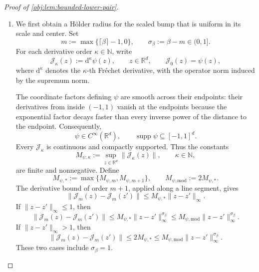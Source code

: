 \documentclass[11pt]{article}
\begin{document}
\begin{proof}[Proof of \cref{obj:lem:bounded-lower-pair}]
\begin{enumerate}
\item We first obtain a Hölder radius for the scaled bump that is uniform in its scale and center. Set
\[
m:=\max\{\lceil\beta\rceil-1,0\},
\qquad
\sigma_\beta:=\beta-m\in(0,1].
\]
For each derivative order \(\kappa\in\mathbb N\), write
\[
\mathscr J_\kappa(z):=\mathrm d^\kappa\psi(z),
\qquad z\in\mathbb R^d,
\qquad
\mathscr J_0(z)=\psi(z),
\]
where \(\mathrm d^\kappa\) denotes the \(\kappa\)-th Fréchet derivative, with the operator norm induced by the supremum norm.

The coordinate factors defining \(\psi\) are smooth across their endpoints: their derivatives from inside \((-1,1)\) vanish at the endpoints because the exponential factor decays faster than every inverse power of the distance to the endpoint. Consequently,
\[
\psi\in C^\infty(\mathbb R^d),
\qquad
\operatorname{supp}\psi\subseteq[-1,1]^d.
\]
Every \(\mathscr J_\kappa\) is continuous and compactly supported. Thus the constants
\[
M_{\psi,\kappa}:=
\sup_{z\in\mathbb R^d}\|\mathscr J_\kappa(z)\|,
\qquad \kappa\in\mathbb N,
\]
are finite and nonnegative. Define
\[
M_{\psi,*}:=\max\{M_{\psi,m},M_{\psi,m+1}\},
\qquad
M_{\psi,\mathrm{mod}}:=2M_{\psi,*}.
\]
The derivative bound of order \(m+1\), applied along a line segment, gives
\[
\|\mathscr J_m(z)-\mathscr J_m(z')\|
\le M_{\psi,*}\|z-z'\|_\infty.
\]
If \(\|z-z'\|_\infty\le1\), then
\[
\|\mathscr J_m(z)-\mathscr J_m(z')\|
\le M_{\psi,*}\|z-z'\|_\infty^{\sigma_\beta}
\le M_{\psi,\mathrm{mod}}\|z-z'\|_\infty^{\sigma_\beta}.
\]
If \(\|z-z'\|_\infty>1\), then
\[
\|\mathscr J_m(z)-\mathscr J_m(z')\|
\le 2M_{\psi,*}
\le M_{\psi,\mathrm{mod}}\|z-z'\|_\infty^{\sigma_\beta}.
\]
These two cases include \(\sigma_\beta=1\).


\end{enumerate}
\end{proof}
\end{document}
